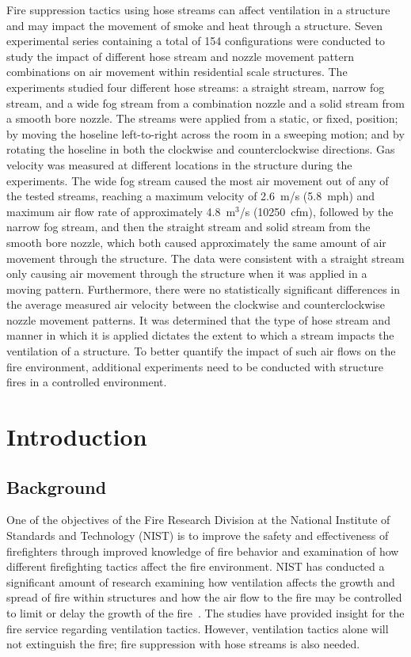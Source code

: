 \documentclass[12pt,oneside]{book}
\begin{document}
Fire suppression tactics using hose streams can affect ventilation in a structure and may impact the movement of smoke and heat through a structure. Seven experimental series containing a total of 154 configurations were conducted to study the impact of different hose stream and nozzle movement pattern combinations on air movement within residential scale structures. The experiments studied four different hose streams: a straight stream, narrow fog stream, and a wide fog stream from a combination nozzle and a solid stream from a smooth bore nozzle. The streams were applied from a static, or fixed, position; by moving the hoseline left-to-right across the room in a sweeping motion; and by rotating the hoseline in both the clockwise and counterclockwise directions. Gas velocity was measured at different locations in the structure during the experiments. The wide fog stream caused the most air movement out of any of the tested streams, reaching a maximum velocity of 2.6~m/s (5.8~mph) and maximum air flow rate of approximately 4.8~m$^3$/s (10250~cfm), followed by the narrow fog stream, and then the straight stream and solid stream from the smooth bore nozzle, which both caused approximately the same amount of air movement through the structure. The data were consistent with a straight stream only causing air movement through the structure when it was applied in a moving pattern. Furthermore, there were no statistically significant differences in the average measured air velocity between the clockwise and counterclockwise nozzle movement patterns. It was determined that the type of hose stream and manner in which it is applied dictates the extent to which a stream impacts the ventilation of a structure. To better quantify the impact of such air flows on the fire environment, additional experiments need to be conducted with structure fires in a controlled environment.

\mainmatter

\chapter{Introduction}
\label{chap:intro}
\section{Background}
\label{sec:background}

One of the objectives of the Fire Research Division at the National Institute of Standards and Technology (NIST) is to improve the safety and effectiveness of firefighters through improved knowledge of fire behavior and examination of how different firefighting tactics affect the fire environment. NIST has conducted a significant amount of research examining how ventilation affects the growth and spread of fire within structures and how the air flow to the fire may be controlled to limit or delay the growth of the fire~\cite{madrzykowski2009fire,kerber2009fire}. The studies have provided insight for the fire service regarding ventilation tactics. However, ventilation tactics alone will not extinguish the fire; fire suppression with hose streams is also needed.
\end{document}
